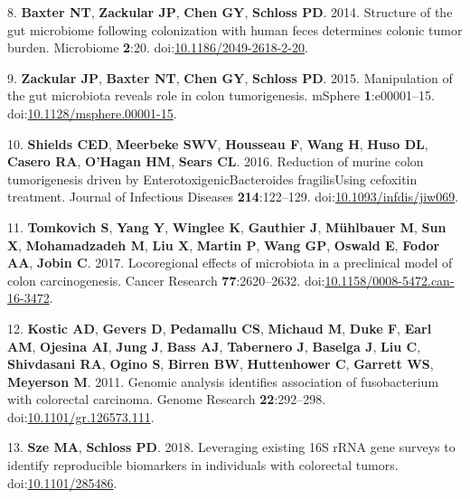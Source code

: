 \documentclass[11pt,]{article}
\begin{document}
\leavevmode\hypertarget{ref-Baxter2014}{}%
8. \textbf{Baxter NT}, \textbf{Zackular JP}, \textbf{Chen GY},
\textbf{Schloss PD}. 2014. Structure of the gut microbiome following
colonization with human feces determines colonic tumor burden.
Microbiome \textbf{2}:20.
doi:\href{https://doi.org/10.1186/2049-2618-2-20}{10.1186/2049-2618-2-20}.

\leavevmode\hypertarget{ref-Zackular2015}{}%
9. \textbf{Zackular JP}, \textbf{Baxter NT}, \textbf{Chen GY},
\textbf{Schloss PD}. 2015. Manipulation of the gut microbiota reveals
role in colon tumorigenesis. mSphere \textbf{1}:e00001--15.
doi:\href{https://doi.org/10.1128/msphere.00001-15}{10.1128/msphere.00001-15}.

\leavevmode\hypertarget{ref-DeStefanoShields2016}{}%
10. \textbf{Shields CED}, \textbf{Meerbeke SWV}, \textbf{Housseau F},
\textbf{Wang H}, \textbf{Huso DL}, \textbf{Casero RA}, \textbf{O'Hagan
HM}, \textbf{Sears CL}. 2016. Reduction of murine colon tumorigenesis
driven by EnterotoxigenicBacteroides fragilisUsing cefoxitin treatment.
Journal of Infectious Diseases \textbf{214}:122--129.
doi:\href{https://doi.org/10.1093/infdis/jiw069}{10.1093/infdis/jiw069}.

\leavevmode\hypertarget{ref-Tomkovich2017}{}%
11. \textbf{Tomkovich S}, \textbf{Yang Y}, \textbf{Winglee K},
\textbf{Gauthier J}, \textbf{Mühlbauer M}, \textbf{Sun X},
\textbf{Mohamadzadeh M}, \textbf{Liu X}, \textbf{Martin P}, \textbf{Wang
GP}, \textbf{Oswald E}, \textbf{Fodor AA}, \textbf{Jobin C}. 2017.
Locoregional effects of microbiota in a preclinical model of colon
carcinogenesis. Cancer Research \textbf{77}:2620--2632.
doi:\href{https://doi.org/10.1158/0008-5472.can-16-3472}{10.1158/0008-5472.can-16-3472}.

\leavevmode\hypertarget{ref-Kostic2011}{}%
12. \textbf{Kostic AD}, \textbf{Gevers D}, \textbf{Pedamallu CS},
\textbf{Michaud M}, \textbf{Duke F}, \textbf{Earl AM}, \textbf{Ojesina
AI}, \textbf{Jung J}, \textbf{Bass AJ}, \textbf{Tabernero J},
\textbf{Baselga J}, \textbf{Liu C}, \textbf{Shivdasani RA},
\textbf{Ogino S}, \textbf{Birren BW}, \textbf{Huttenhower C},
\textbf{Garrett WS}, \textbf{Meyerson M}. 2011. Genomic analysis
identifies association of fusobacterium with colorectal carcinoma.
Genome Research \textbf{22}:292--298.
doi:\href{https://doi.org/10.1101/gr.126573.111}{10.1101/gr.126573.111}.

\leavevmode\hypertarget{ref-Sze2018}{}%
13. \textbf{Sze MA}, \textbf{Schloss PD}. 2018. Leveraging existing 16S
rRNA gene surveys to identify reproducible biomarkers in individuals
with colorectal tumors.
doi:\href{https://doi.org/10.1101/285486}{10.1101/285486}.
\end{document}
